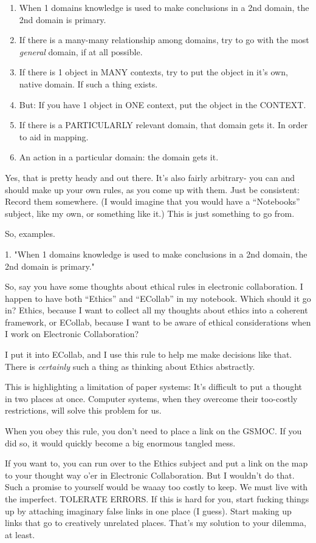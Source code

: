 \documentclass[oneside]{book}
\begin{document}
\begin{enumerate}
\item When 1 domains knowledge is used to make conclusions in a 2nd
   domain, the 2nd domain is primary.
\item If there is a many-many relationship among domains, try to go with
   the most \emph{general} domain, if at all possible.
\item If there is 1 object in MANY contexts, try to put the object in
   it's own, native domain. If such a thing exists.
\item But: If you have 1 object in ONE context, put the object in the
   CONTEXT.
\item If there is a PARTICULARLY relevant domain, that domain gets it.
   In order to aid in mapping.
\item An action in a particular domain: the domain gets it.
\end{enumerate}

Yes, that is pretty heady and out there. It's also fairly arbitrary-
you can and should make up your own rules, as you come up with
them. Just be consistent: Record them somewhere. (I would imagine that
you would have a ``Notebooks'' subject, like my own, or something like
it.) This is just something to go from.

So, examples.

1. "When 1 domains knowledge is used to make conclusions in a 2nd
    domain, the 2nd domain is primary."

So, say you have some thoughts about ethical rules in electronic
collaboration. I happen to have both ``Ethics'' and ``ECollab'' in my
notebook. Which should it go in? Ethics, because I want to collect all
my thoughts about ethics into a coherent framework, or ECollab,
because I want to be aware of ethical considerations when I work on
Electronic Collaboration?

I put it into ECollab, and I use this rule to help me make decisions
like that. There is \emph{certainly} such a thing as thinking about Ethics
abstractly.

This is highlighting a limitation of paper systems: It's difficult to
put a thought in two places at once. Computer systems, when they
overcome their too-costly restrictions, will solve this problem for us.

When you obey this rule, you don't need to place a link on the
GSMOC. If you did so, it would quickly become a big enormous tangled
mess.

If you want to, you can run over to the Ethics subject and put a link
on the map to your thought way o'er in Electronic Collaboration. But I
wouldn't do that. Such a promise to yourself would be waaay too costly
to keep. We must live with the imperfect. TOLERATE ERRORS. If this is
hard for you, start fucking things up by attaching imaginary false
links in one place (I guess). Start making up links that go to
creatively unrelated places. That's my solution to your dilemma, at
least.
\end{document}
